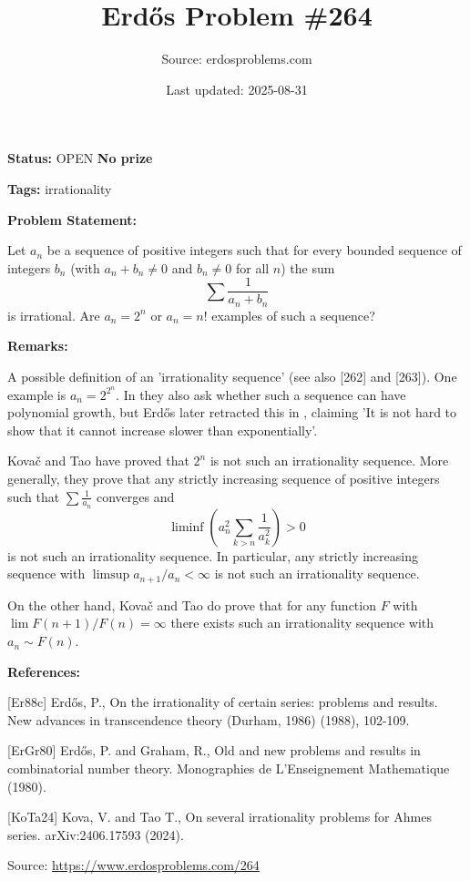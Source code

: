 \documentclass{article}
\title{Erd\H{o}s Problem \#264}
\date{Last updated: 2025-08-31}
\author{Source: erdosproblems.com}
\begin{document}
\maketitle

\noindent\textbf{Status:} OPEN \quad \textbf{No prize}

\noindent\textbf{Tags:} irrationality

\medskip
\noindent\textbf{Problem Statement:}

Let $a_n$ be a sequence of positive integers such that for every bounded sequence of integers $b_n$ (with $a_n+b_n\neq 0$ and $b_n\neq 0$ for all $n$) the sum\[\sum \frac{1}{a_n+b_n}\]is irrational. Are $a_n=2^n$ or $a_n=n!$ examples of such a sequence?

\bigskip
\noindent\textbf{Remarks:}

A possible definition of an 'irrationality sequence' (see also [262] and [263]). One example is $a_n=2^{2^n}$. In \cite{ErGr80} they also ask whether such a sequence can have polynomial growth, but Erd\H{o}s later retracted this in \cite{Er88c}, claiming 'It is not hard to show that it cannot increase slower than exponentially'.

Kova\v{c} and Tao \cite{KoTa24} have proved that $2^n$ is not such an irrationality sequence. More generally, they prove that any strictly increasing sequence of positive integers such that $\sum\frac{1}{a_n}$ converges and\[\liminf \left(a_n^2\sum_{k>n}\frac{1}{a_k^2}\right) >0 \]is not such an irrationality sequence. In particular, any strictly increasing sequence with $\limsup a_{n+1}/a_n <\infty$ is not such an irrationality sequence.

On the other hand, Kova\v{c} and Tao do prove that for any function $F$ with $\lim F(n+1)/F(n)=\infty$ there exists such an irrationality sequence with $a_n\sim F(n)$.

\bigskip
\noindent\textbf{References:}

[Er88c] Erd\H{o}s, P., On the irrationality of certain series: problems and results. New advances in transcendence theory (Durham, 1986) (1988), 102-109.
 
 [ErGr80] Erd\H{o}s, P. and Graham, R., Old and new problems and results in combinatorial number theory. Monographies de L'Enseignement Mathematique (1980).
 
 [KoTa24] Kova\vC, V. and Tao T., On several irrationality problems for Ahmes series. arXiv:2406.17593 (2024).

\bigskip
\noindent\small{Source: \url{https://www.erdosproblems.com/264}}
\end{document}
